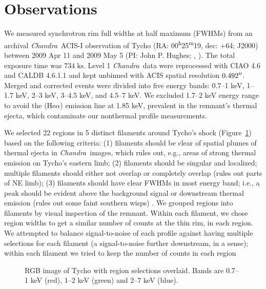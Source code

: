 \documentclass[iop, apj, numberedappendix, twocolappendix]{emulateapj}
\newcommand*{\mt}{\mathrm}
\newcommand*{\unit}[1]{\;\mt{#1}}  %
\newcommand*{\tsup}{\textsuperscript}
\newcommand*{\Chandra}{\textit{Chandra}\ }
\begin{document}
\section{Observations}
\label{sec:observations}

We measured synchrotron rim full widths at half maximum (FWHMs) from an
archival \Chandra ACIS-I observation of Tycho
(RA: 00\tsup{h}25\tsup{m}19, dec: +64; J2000)
between 2009 Apr 11 and 2009 May 5 (PI: John P. Hughes;
,
).
The total exposure time was $734 \unit{ks}$.
Level 1 \Chandra data were reprocessed with CIAO 4.6 and CALDB 4.6.1.1 and kept
unbinned with ACIS spatial resolution $0.492\mbox{$^{\prime\prime}$}$.
Merged and corrected events were divided into five energy bands:
0.7--1 keV, 1--1.7 keV, 2--3 keV, 3--4.5 keV, and 4.5--7 keV.
We excluded 1.7--2 keV energy range to avoid the  (He$\alpha$)
emission line at 1.85 keV, prevalent in the remnant's thermal ejecta, which
  
contaminate our nonthermal profile measurements.

We selected 22 regions in 5 distinct filaments around Tycho's shock
(Figure~\ref{fig:snr}) based on the following criteria: (1) filaments should be
clear of spatial plumes of thermal ejecta in \Chandra images, which rules out,
e.g., areas of strong thermal emission on Tycho's eastern limb; (2) filaments
should be singular and localized; multiple filaments should either not
overlap or completely overlap (rules out parts of NE limb); (3) filaments
should have clear FWHMs in most energy band; i.e., a peak should be evident
above the background signal or downstream thermal emission (rules out some
faint southern wisps) .  We grouped
regions into filaments by visual inspection of the remnant.
Within each filament, we chose region widths to get a similar number of counts
at the thin rim, in each region. 
We attempted to balance signal-to-noise of each profile against having multiple
selections for each filament (a signal-to-noise further downstream, in a
sense); within each filament we tried to keep the number of counts in each
region

\begin{figure}
    \centering
    \caption{RGB image of Tycho with region selections overlaid.  Bands are
    0.7--1 keV (red), 1--2 keV (green) and 2--7 keV (blue).
    }
    \label{fig:snr}
\end{figure}
\end{document}
